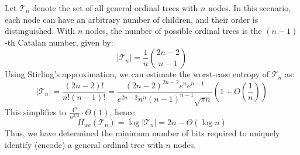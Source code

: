 \begin{example}
    Let $\mathcal{T}_n$ denote the set of all general ordinal trees \cite{benoit2005representing} with $n$ nodes. In this scenario, each node can have an arbitrary number of children, and their order is distinguished. With $n$ nodes, the number of possible ordinal trees is the $(n-1)$-th Catalan number, given by:
    \begin{equation}
        |\mathcal{T}_n| = \frac{1}{n} \binom{2n - 2}{n - 1}
    \end{equation}
    Using Stirling's approximation, we can estimate the worst-case entropy of $\mathcal{T}_n$ as:
    \begin{equation*}
        |\mathcal{T}_n| = \frac{(2n-2)!}{n!(n-1)!} = \frac{(2n-2)^{2n-2} e^n e^{n-1}}{e^{2n-2} n^n (n-1)^{n-1} \sqrt{\pi n}} \left(1+ O\left(\frac{1}{n}\right)\right)
    \end{equation*}
    This simplifies to $\frac{4^n}{n^{3/2}} \cdot \Theta (1)$, hence
    \begin{equation}
        H_{wc} (\mathcal{T}_n) = \log |\mathcal{T}_n| = 2n - \Theta(\log n)
    \end{equation}
    Thus, we have determined the minimum number of bits required to uniquely identify (encode) a general ordinal tree with $n$ nodes.
\end{example}









